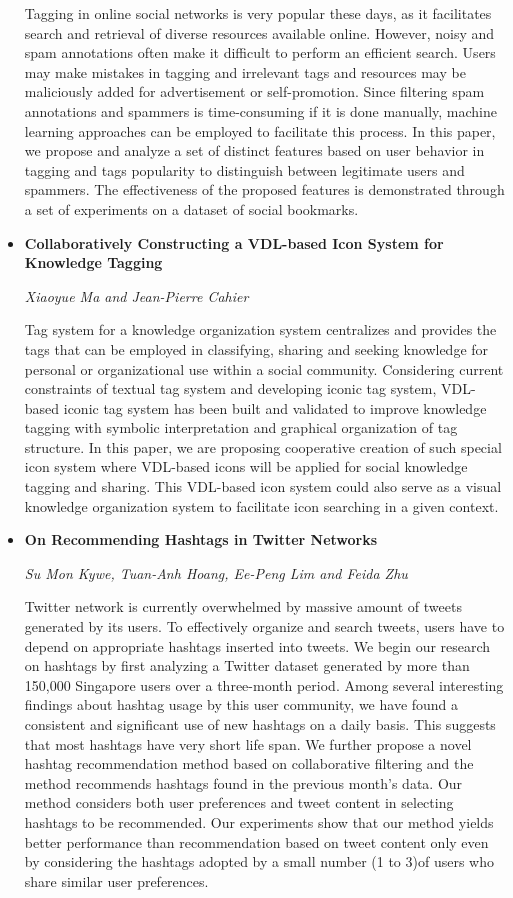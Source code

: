 \documentclass[a4paper,12pt,svgnames]{report}
\begin{document}
\begin{itemize}
Tagging in online social networks is very popular these days, as it facilitates
search and retrieval of diverse resources available online. However, noisy and
spam annotations often make it difficult to perform an efficient search. Users
may make mistakes in tagging and irrelevant tags and resources may be
maliciously added for advertisement or self-promotion. Since filtering spam
annotations and spammers is time-consuming if it is done manually, machine
learning approaches can be employed to facilitate this process. In this paper,
we propose and analyze a set of distinct features based on user behavior in
tagging and tags popularity to distinguish between legitimate users and
spammers. The effectiveness of the proposed features is demonstrated through a
set of experiments on a dataset of social bookmarks.


\item \textbf{Collaboratively Constructing a VDL-based Icon System for Knowledge
Tagging}

\textit{Xiaoyue Ma and Jean-Pierre Cahier}

Tag system for a knowledge organization system centralizes and provides the tags
that can be employed in classifying, sharing and seeking knowledge for personal
or organizational use within a social community. Considering current constraints
of textual tag system and developing iconic tag system, VDL-based iconic tag
system has been built and validated to improve knowledge tagging with symbolic
interpretation and graphical organization of tag structure. In this paper, we
are proposing cooperative creation of such special icon system where VDL-based
icons will be applied for social knowledge tagging and sharing. This VDL-based
icon system could also serve as a visual knowledge organization system to
facilitate icon searching in a given context.

\item \textbf{On Recommending Hashtags in Twitter Networks}

\textit{Su Mon Kywe, Tuan-Anh Hoang, Ee-Peng Lim and Feida Zhu}

Twitter network is currently overwhelmed by massive amount of tweets generated
by its users. To effectively organize and search tweets, users have to depend on
appropriate hashtags inserted into tweets. We begin our research on hashtags by
first analyzing a Twitter dataset generated by more than 150,000 Singapore users
over a three-month period. Among several interesting findings about hashtag
usage by this user community, we have found a consistent and significant use of
new hashtags on a daily basis. This suggests that most hashtags have very short
life span. We further propose a novel hashtag recommendation method based on
collaborative filtering and the method recommends hashtags found in the previous
month's data. Our method considers both user preferences and tweet content in
selecting hashtags to be recommended. Our experiments show that our method
yields better performance than recommendation based on tweet content only even
by considering the hashtags adopted by a small number (1 to 3)of users who share
similar user preferences.


\end{itemize}
\end{document}
